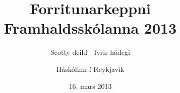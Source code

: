 \documentclass[11pt,a4paper,oneside]{article}
\title{Forritunarkeppni Framhaldsskólanna 2013}
\subtitle{Scotty deild - fyrir hádegi}
\date{16. mars 2013}
\author{Háskólinn í Reykjavík}
\newcommand{\problemstatement}[1]{  }
\begin{document}
	\maketitle
	\thispagestyle{empty}
	\pagebreak
	\problemstatement{hallo_heimur}
	\problemstatement{namundun}
	\problemstatement{nidurteljari}
	\problemstatement{jolagjafir}
	\problemstatement{fjoldi_stafa}
	\problemstatement{tveirstrengir}
	\problemstatement{happy_birthday}
	\problemstatement{deiling}
	\problemstatement{deiling_while}
	\problemstatement{compression}
	\problemstatement{decompression}
	\problemstatement{gotumalning}
    \problemstatement{talnaspirall}
	\problemstatement{ex}
    \problemstatement{hamming_distance}
	\problemstatement{stigatafla}
	\problemstatement{logleg_nofn}
	\problemstatement{stysta_leid_skak}
\end{document}
